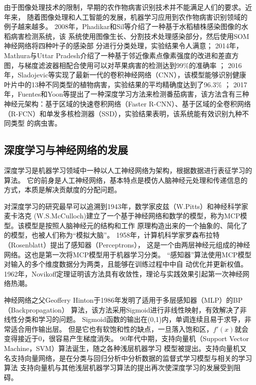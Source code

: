     由于图像处理技术的限制，早期的农作物病害识别技术并不能满足人们的要求。近年来，
    随着图像处理和人工智能的发展，机器学习应用到农作物病害识别领域的例子越来越多。
    2008年，Phadikar和Sil等介绍了一种基于水稻植株感染图像的水稻病害检测系统，该
    系统使用图像生长、分割技术处理感染部分，然后使用SOM神经网络将四种叶子的感染部
    分进行分类处理，实验结果令人满意；
    2014年，Mathura与Uttar Pradesh介绍了一种基于邻近像素点像素强度的改进和差直方
    图，与梯度滤波器相配合使用可以对苹果病害的检测达到99\%的准确率 ；
    2016年，Sladojevic等实现了最新一代的卷积神经网络（CNN），该模型能够识别健康
    叶片中的13种不同类型的植物病害，实验结果的平均精确度达到了96.3\% ；
    2017年，Fuentes和Yoon等提出了一种深度学习方法来检测番茄病害，该方法含有三种
    神经元架构：基于区域的快速卷积网络（Faster R-CNN）、基于区域的全卷积网络
    （R-FCN）和单发多核检测器（SSD），实验结果表明，该系统能有效识别九种不同类型
    的病虫害。

\subsection{\hei\xiaosan\textbf{深度学习与神经网络的发展}}
  深度学习是机器学习领域中一种以人工神经网络为架构，根据数据进行表征学习的算法。
  它的前身是人工神经网络，基本特点是模仿人脑神经元处理和传递信息的方式，本质是解决贡献度的分配问题。

  对深度学习的研究最早可以追溯到1943年，数学家皮兹（W.Pitts）和神经科学家麦卡洛克
  (W.S.McCulloch)建立了一个基于神经网络和数学的模型，称为MCP模型。该模型是按照人脑神经元的结构和工作
  原理构造出来的一个抽象的、简化了的模型，也被人们称为“模拟大脑”。
  1958年，计算机科学家罗森布拉特（Rosenblatt）提出了感知器（Perceptrons），
  这是一个由两层神经元组成的神经网络。这也是第一次将MCP模型用于机器学习分类。
  “感知器”算法使用MCP模型对输入的多个维度数据分为两类，且能够在训练过程中中自
  动优化并更新权值。1962年，Novikoff定理证明该方法具有收敛性，理论与实践效果引起第一次神经网络热潮。

  神经网络之父Geoffery Hinton于1986年发明了适用于多层感知器（MLP）的BP（Backpropagation）
  算法，该方法采用Sigmoid进行非线性映射，有效解决了非线性分类和学习的问题。
  Sigmoid函数的输出在(0,1)内，单调连续且易于求导，非常适合用作输出层。
  但是它也有软饱和性的缺点，一旦落入饱和区，$f'(x)$就会变得接近于0，很容易产生梯度消失。
  90年代中期，支持向量机（Support Vector Machine，SVM）算法诞生，随之各种浅层机器学习
  模型被提出。支持向量机又名支持向量网络，是在分类与回归分析中分析数据的监督式学习模型与相关的学习算法
  支持向量机与其他浅层机器学习算法的提出再次使深度学习的发展受到阻碍。

